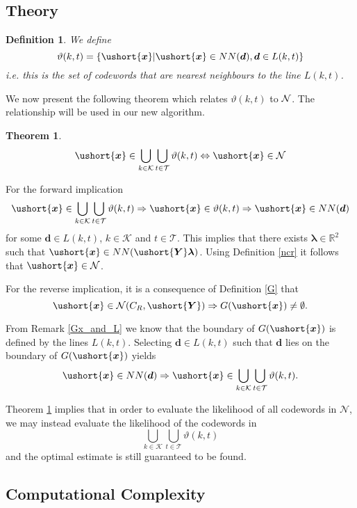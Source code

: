 \documentclass[conference]{IEEEtran}
\newtheorem{theorem}{Theorem}
\newtheorem{definition}{Definition}
\newcommand{\reals}{{\mathbb R}}
\newcommand{\uY}{\ushort{\bm{Y}}}
\newcommand{\ux}{\ushort{\bm{x}}}
\begin{document}
\subsection{Theory}

\begin{definition} We define
\[
\vartheta(k, t) = \{\ux | \ux \in NN(\bm{d}), \bm{d} \in L(k,t) \}
\]
\emph{i.e.} this is the set of codewords that are nearest neighbours to the line $L(k,t)$.
\end{definition}

We now present the following theorem which relates $\vartheta(k,t)$ to $\cal{N}$.  The relationship will be used in our new algorithm.

\begin{theorem} \label{line_search_valid}
\[
\ux \in \bigcup_{k \in {\mathcal K}}\bigcup_{t \in {\mathcal T}}{\vartheta(k, t)} \Leftrightarrow \ux \in {\mathcal N}
\]
\end{theorem}
\begin{IEEEproof}
For the forward implication
\[
\ux \in \bigcup_{k \in {\mathcal K}}\bigcup_{t \in {\mathcal T}}{\vartheta(k, t)} \Rightarrow \ux \in \vartheta(k, t) \Rightarrow \ux \in NN(\bm{d})
\]
for some $\bm{d} \in L(k,t)$, $k \in {\mathcal K}$ and $t \in {\mathcal T}$.  This implies that there exists $\bm{\lambda}\in\reals^2$ such that $\ux \in NN(\uY\bm{\lambda})$.  Using Definition \ref{ncr} it follows that $\ux \in {\mathcal N}$.

For the reverse implication, it is a consequence of Definition \ref{G} that
\[
\ux \in {\mathcal N}(C_R,\uY) \Rightarrow G(\ux) \neq \emptyset.
\]

From Remark \ref{Gx_and_L} we know that the boundary of $G(\ux)$ is defined by the lines $L(k,t)$.  Selecting $\bm{d} \in L(k,t)$ such that $\bm{d}$ lies on the boundary of $G(\ux)$ yields
\[
\ux \in NN(\bm{d}) \Rightarrow \ux \in \bigcup_{k \in {\mathcal K}}\bigcup_{t \in {\mathcal T}}{\vartheta(k, t)}.
\]
\end{IEEEproof}

Theorem \ref{line_search_valid} implies that in order to evaluate the likelihood of all codewords in ${\mathcal N}$, we may instead evaluate the likelihood of the codewords in
\begin{equation} \label{eq_bigsearch}
\bigcup_{k \in {\mathcal K}}\bigcup_{t \in {\mathcal T}}{\vartheta(k, t)}
\end{equation}
and the optimal estimate is still guaranteed to be found.

\subsection{Computational Complexity}
\end{document}
